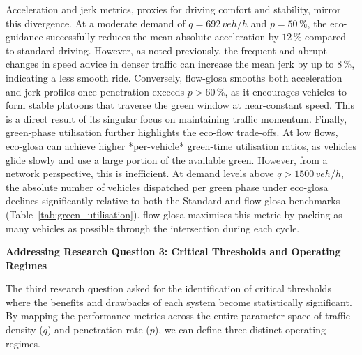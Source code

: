 \mynewline
Acceleration and jerk metrics, proxies for driving comfort and stability, mirror this divergence. At a moderate demand of $q=692\,\unit{veh/h}$ and $p=50\,\%$, the eco-guidance successfully reduces the mean absolute acceleration by $12\,\%$ compared to standard driving. However, as noted previously, the frequent and abrupt changes in speed advice in denser traffic can increase the mean jerk by up to $8\,\%$, indicating a less smooth ride. Conversely, \ac{flow-glosa} smooths both acceleration and jerk profiles once penetration exceeds $p>60\,\%$, as it encourages vehicles to form stable platoons that traverse the green window at near-constant speed. This is a direct result of its singular focus on maintaining traffic momentum.
\mynewline
Finally, green-phase utilisation further highlights the eco-flow trade-offs. At low flows, \ac{eco-glosa} can achieve higher *per-vehicle* green-time utilisation ratios, as vehicles glide slowly and use a large portion of the available green. However, from a network perspective, this is inefficient. At demand levels above $q>1500\,\unit{veh/h}$, the absolute number of vehicles dispatched per green phase under \ac{eco-glosa} declines significantly relative to both the Standard and \ac{flow-glosa} benchmarks (Table~\ref{tab:green_utilisation}). \ac{flow-glosa} maximises this metric by packing as many vehicles as possible through the intersection during each cycle.

\bigskip
\textbf{Addressing Research Question 3: Critical Thresholds and Operating Regimes}

The third research question asked for the identification of critical thresholds where the benefits and drawbacks of each system become statistically significant. By mapping the performance metrics across the entire parameter space of traffic density ($q$) and penetration rate ($p$), we can define three distinct operating regimes.

